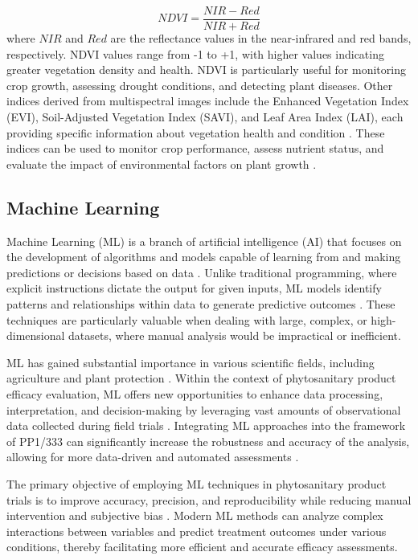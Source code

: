 \documentclass[12pt,a4paper,oneside]{report}
\begin{document}
\[
NDVI = \frac{NIR - Red}{NIR + Red}
\]
where \(NIR\) and \(Red\) are the reflectance values in the near-infrared and red
bands, respectively. NDVI values range from -1 to +1, with higher values indicating
greater vegetation density and health. NDVI is particularly useful for monitoring
crop growth, assessing drought conditions, and detecting plant diseases.
Other indices derived from multispectral images include the Enhanced
Vegetation Index (EVI), Soil-Adjusted Vegetation Index (SAVI), and Leaf Area
Index (LAI), each providing specific information about vegetation health and
condition
\cite{huete_overview_2002, qi_modified_1994}. 
These indices can be used to monitor crop performance, assess
nutrient status, and evaluate the impact of environmental factors on plant
growth
\cite{jones_remote_2010, mahlein_recent_2018}.

\subsection{Machine Learning}

Machine Learning (ML) is a branch of artificial intelligence (AI) that 
focuses on the development of algorithms and models capable of learning 
from and making predictions or decisions based on data \cite{Koza1996}. Unlike traditional 
programming, where explicit instructions dictate the output for given inputs, 
ML models identify patterns and relationships within data to generate 
predictive outcomes \cite{hastie_elements_2009}. These techniques are particularly valuable when 
dealing with large, complex, or high-dimensional datasets, where manual 
analysis would be impractical or inefficient.

ML has gained substantial importance in various scientific fields, including 
agriculture \cite{agronomy13122976} and plant protection \cite{bock_visual_2020}. Within the context of phytosanitary product 
efficacy evaluation, ML offers new opportunities to enhance data processing, 
interpretation, and decision-making by leveraging vast amounts of observational 
data collected during field trials \cite{bock_phytopathometry_2022}. Integrating ML approaches into the framework 
of PP1/333 can significantly increase the robustness and accuracy of the analysis, 
allowing for more data-driven and automated assessments \cite{barbedo_automatic_2014,arnal_barbedo_digital_2013,bock_plant_2010}.

The primary objective of employing ML techniques in phytosanitary product trials 
is to improve accuracy, precision, and reproducibility while reducing manual 
intervention and subjective bias \cite{bock_visual_2020}. Modern ML methods can analyze complex interactions 
between variables and predict treatment outcomes under various conditions, thereby 
facilitating more efficient and accurate efficacy assessments.
\end{document}
